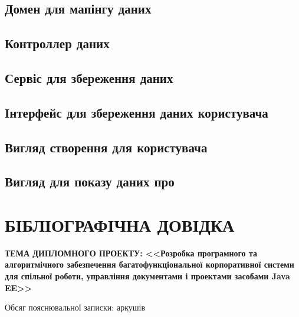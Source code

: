 \subsection*{Домен для мапінгу даних}


\subsection*{Контроллер даних}


\subsection*{Сервіс для збереження даних}


\subsection*{Інтерфейс для збереження даних користувача}


\subsection*{Вигляд створення для користувача}


\subsection*{Вигляд для показу даних про}



\let\mycontinue\relax %

\section*{БІБЛІОГРАФІЧНА ДОВІДКА}
{\bf ТЕМА ДИПЛОМНОГО ПРОЕКТУ: <<Розробка програмного та алгоритмічного забезпечення багатофункціональної корпоративної системи для спільної роботи, управління документами і проектами засобами Java EE>>}
\vspace{30 mm}
\par Обсяг пояснювальної записки:\noindent\underline{} аркушів

\vspace{60 mm}

